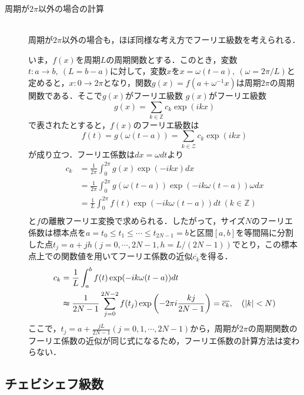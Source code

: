 \documentclass[11pt,a4paper]{jsarticle}
\theoremstyle{definition}
\begin{document}
\begin{description}
  \item[周期が$2\pi$以外の場合の計算]
    \quad\\
    周期が$2\pi$以外の場合も，ほぼ同様な考え方でフーリエ級数を考えられる．

    いま，$f(x)$を周期$L$の周期関数とする．このとき，変数$t:a\rightarrow b,\ (L=b-a)$に対して，変数$x$を$x=\omega (t-a),\ (\omega = 2\pi /L)$と定めると，$x:0\rightarrow 2\pi$となり，関数$g(x)=f(a+\omega^{-1}x)$は周期$2\pi$の周期関数である．そこで$g(x)$がフーリエ級数
    $g(x)$がフーリエ級数
    \begin{equation*}
      g(x) = \sum_{k\in\mathbb{Z}} c_k \exp(ikx)
    \end{equation*}
    で表されたとすると，$f(x)$のフーリエ級数は
    \begin{equation*}
      f(t) = g(\omega (t-a)) = \sum_{k\in\mathcal{Z}} c_k \exp(ikx)
    \end{equation*}
    が成り立つ．フーリエ係数は$dx=\omega dt$より
    \begin{align*}
      c_k & = \frac{1}{2\pi} \int_{0}^{2\pi} g(x) \exp(-ikx) dx                              \\
          & = \frac{1}{2\pi} \int_{0}^{2\pi} g(\omega (t-a)) \exp(-ik\omega (t-a)) \omega dx \\
          & = \frac{1}{L} \int_{0}^{2\pi} f(t) \exp(-ik\omega (t-a)) dt   \ (k\in\mathbb{Z}) \\
    \end{align*}
    と$f$の離散フーリエ変換で求められる．したがって，サイズ$N$のフーリエ係数は標本点を$a=t_0 \leq t_1 \leq \cdots \leq t_{2N-1}=b$と区間$[a,b]$を等間隔に分割した点$t_j=a+jh(j=0,\cdots,2N-1,h=L/(2N-1))$でとり，この標本点上での関数値を用いてフーリエ係数の近似$\overline{c_k}$を得る．
    \begin{align*}
      c_k & = \frac{1}{L} \int_{a}^{b} f(t) \exp(-ik\omega (t-a)) dt                                                                     \\
          & \thickapprox \frac{1}{2N-1} \sum_{j=0}^{2N-2} f(t_j) \exp\left(-2\pi i \frac{kj}{2N-1}\right) = \overline{c_k},\quad (|k|<N)
    \end{align*}
    ここで，$t_j=a+\frac{jL}{2N-1}(j=0,1,\cdots,2N-1)$から，周期が$2\pi$の周期関数のフーリエ係数の近似が同じ式になるため，フーリエ係数の計算方法は変わらない．
\end{description}

\subsection{チェビシェフ級数}
\end{document}
